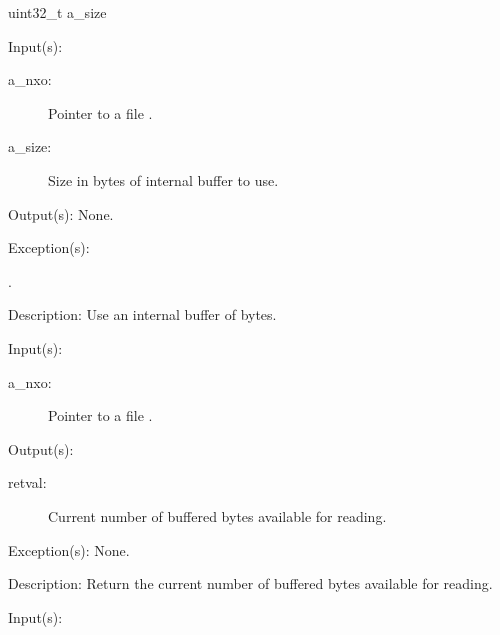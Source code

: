 \begin{capi}
{{uint32\_t a\_size}}
	\begin{capilist}
	\item[Input(s): ]
		\begin{description}\item[]
		\item[a\_nxo: ]
			Pointer to a file .
		\item[a\_size: ]
			Size in bytes of internal buffer to use.
		\end{description}
	\item[Output(s): ] None.
	\item[Exception(s): ]
		\begin{description}\item[]
		\item[.]
		\end{description}
	\item[Description: ]
		Use an internal buffer of  bytes.
	\end{capilist}
\label{nxo_file_buffer_count}
	\begin{capilist}
	\item[Input(s): ]
		\begin{description}\item[]
		\item[a\_nxo: ]
			Pointer to a file \classname{nxo}.
		\end{description}
	\item[Output(s): ]
		\begin{description}\item[]
		\item[retval: ]
			Current number of buffered bytes available for reading.
		\end{description}
	\item[Exception(s): ] None.
	\item[Description: ]
		Return the current number of buffered bytes available for
		reading.
	\end{capilist}
\label{nxo_file_buffer_flush}
	\begin{capilist}
	\item[Input(s): ]
		\begin{description}\item[]

\end{description}
\end{capilist}
\end{capi}
